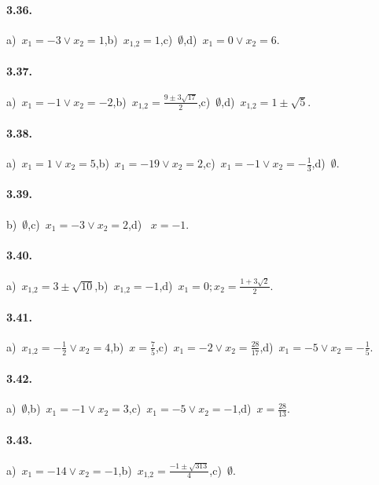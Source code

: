 \paragraph{3.36.} a)~$x_{1} =-3 \vee x_{2} = 1$,\quad b)~$x_{1\text{,}2}= 1$,\quad c)~$\emptyset$,\quad d)~$x_{1} = 0 \vee x_{2} = 6$.

\paragraph{3.37.} a)~$x_{1} =-1 \vee x_{2} =-2$,\quad b)~$x_{1\text{,}2} = \frac{9 \pm 3 \sqrt{17}}{2}$,\quad c)~$\emptyset$,\quad d)~$x_{1\text{,}2} = 1 \pm \sqrt{5}$.

\paragraph{3.38.} a)~$x_{1} = 1 \vee x_{2} = 5$,\quad b)~$x_{1} =-19 \vee x_{2} = 2$,\quad c)~$x_{1} =-1 \vee x_{2} =-\frac{1}{3}$,\quad d)~$\emptyset$.

\paragraph{3.39.} b)~$\emptyset$,\quad c)~$x_{1} =-3 \vee x_{2} = 2$,\quad d)~ $x =-1$.

\paragraph{3.40.} a)~$x_{1\text{,}2} = 3 \pm \sqrt{10}$,\quad b)~$x_{1\text{,}2}=-1$,\quad d)~$x_{1} = 0;x_{2} = \frac{1 + 3 \sqrt{2}}{2}$.

\paragraph{3.41.} a)~$x_{1\text{,}2} =-\frac{1}{2} \vee x_{2} = 4$,\quad b)~$x=\frac{7}{5}$,\quad c)~$x_{1} =-2 \vee x_{2} = \frac{28}{17}$,\quad d)~$x_{1} =-5 \vee x_{2} =-\frac{1}{5}$.

\paragraph{3.42.} a)~$\emptyset$,\quad b)~$x_{1} =-1 \vee x_{2} = 3$,\quad c)~$x_{1} =-5 \vee x_{2} =-1$,\quad d)~$x = \frac{28}{13}$.

\paragraph{3.43.} a)~$x_{1} =-14 \vee x_{2} =-1$,\quad b)~$x_{1\text{,}2} = \frac{- 1 \pm \sqrt{313}}{4}$,\quad c)~$\emptyset$.


